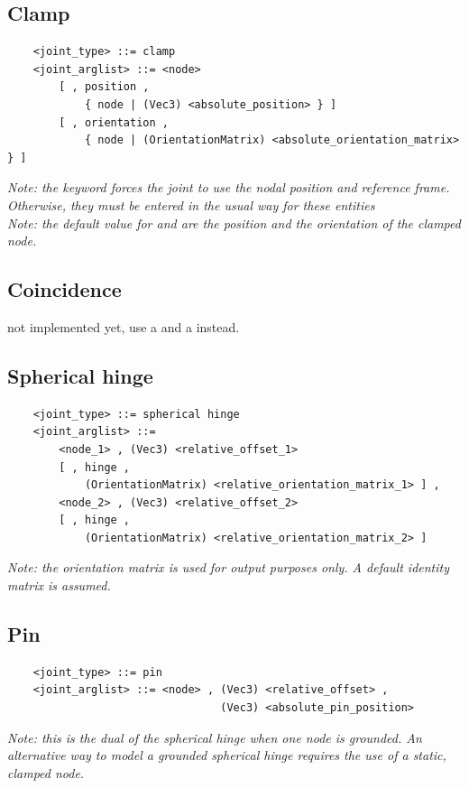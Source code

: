 \subsection{Clamp}
\begin{verbatim}
    <joint_type> ::= clamp 
    <joint_arglist> ::= <node>
        [ , position ,
            { node | (Vec3) <absolute_position> } ]
        [ , orientation ,
            { node | (OrientationMatrix) <absolute_orientation_matrix> } ]
\end{verbatim}
\emph{Note: the keyword  forces the joint to use
the nodal position and reference frame. Otherwise, they must be entered
in the usual way for these entities} \\
\emph{Note: the default value for  and 
are the position and the orientation of the clamped node.}


\subsection{Coincidence}
not implemented yet, use a  and a  
instead.

\subsection{Spherical hinge}
\begin{verbatim}
    <joint_type> ::= spherical hinge
    <joint_arglist> ::= 
        <node_1> , (Vec3) <relative_offset_1> 
        [ , hinge , 
            (OrientationMatrix) <relative_orientation_matrix_1> ] ,
        <node_2> , (Vec3) <relative_offset_2>
        [ , hinge , 
            (OrientationMatrix) <relative_orientation_matrix_2> ]
\end{verbatim}
{\em
    Note: the orientation matrix is used for output purposes only. 
    A default identity matrix is assumed.
}

\subsection{Pin}
\begin{verbatim}
    <joint_type> ::= pin
    <joint_arglist> ::= <node> , (Vec3) <relative_offset> ,
                                 (Vec3) <absolute_pin_position>
\end{verbatim}
{\em
    Note: this is the dual of the spherical hinge when one node is grounded.
    An alternative way to model a grounded spherical hinge requires the use
    of a static, clamped node.
}

